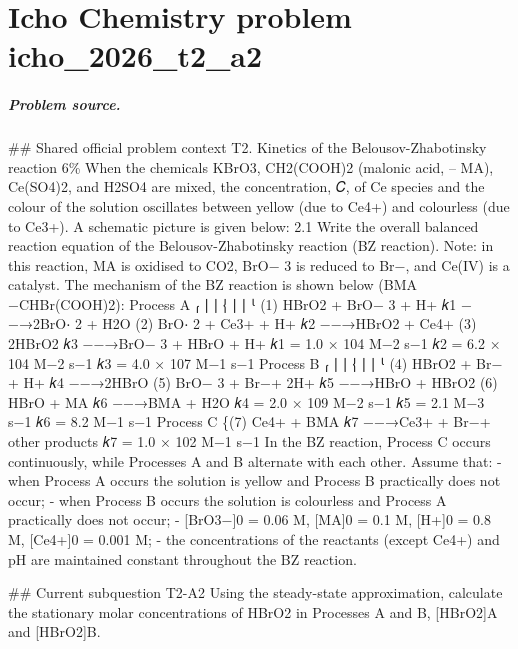 
\chapter{Icho Chemistry problem icho\_2026\_t2\_a2}
\label{ch:IChO2026Problems_problem_icho_2026_t2_a2}

\paragraph{Problem source.}
\#\# Shared official problem context
T2. Kinetics of the Belousov-Zhabotinsky reaction 6\% When the chemicals KBrO3, CH2(COOH)2 (malonic acid, – MA), Ce(SO4)2, and H2SO4 are mixed, the concentration, 𝐶, of Ce species and the colour of the solution oscillates between yellow (due to Ce4+) and colourless (due to Ce3+). A schematic picture is given below: 2.1 Write the overall balanced reaction equation of the Belousov-Zhabotinsky reaction (BZ reaction). Note: in this reaction, MA is oxidised to CO2, BrO− 3 is reduced to Br−, and Ce(IV) is a catalyst. The mechanism of the BZ reaction is shown below (BMA −CHBr(COOH)2): Process A ⎧ ⎪ ⎪ ⎨ ⎪ ⎪ ⎩ (1) HBrO2 + BrO− 3 + H+ 𝑘1 −−→2BrO⋅ 2 + H2O (2) BrO⋅ 2 + Ce3+ + H+ 𝑘2 −−→HBrO2 + Ce4+ (3) 2HBrO2 𝑘3 −−→BrO− 3 + HBrO + H+ 𝑘1 = 1.0 × 104 M−2 s−1 𝑘2 = 6.2 × 104 M−2 s−1 𝑘3 = 4.0 × 107 M−1 s−1 Process B ⎧ ⎪ ⎪ ⎨ ⎪ ⎪ ⎩ (4) HBrO2 + Br−+ H+ 𝑘4 −−→2HBrO (5) BrO− 3 + Br−+ 2H+ 𝑘5 −−→HBrO + HBrO2 (6) HBrO + MA 𝑘6 −−→BMA + H2O 𝑘4 = 2.0 × 109 M−2 s−1 𝑘5 = 2.1 M−3 s−1 𝑘6 = 8.2 M−1 s−1 Process C \{(7) Ce4+ + BMA 𝑘7 −−→Ce3+ + Br−+ other products 𝑘7 = 1.0 × 102 M−1 s−1 In the BZ reaction, Process C occurs continuously, while Processes A and B alternate with each other. Assume that: - when Process A occurs the solution is yellow and Process B practically does not occur; - when Process B occurs the solution is colourless and Process A practically does not occur; - [BrO3−]0 = 0.06 M, [MA]0 = 0.1 M, [H+]0 = 0.8 M, [Ce4+]0 = 0.001 M; - the concentrations of the reactants (except Ce4+) and pH are maintained constant throughout the BZ reaction.

\#\# Current subquestion T2-A2
Using the steady-state approximation, calculate the stationary molar concentrations of HBrO2 in Processes A and B, [HBrO2]A and [HBrO2]B.

